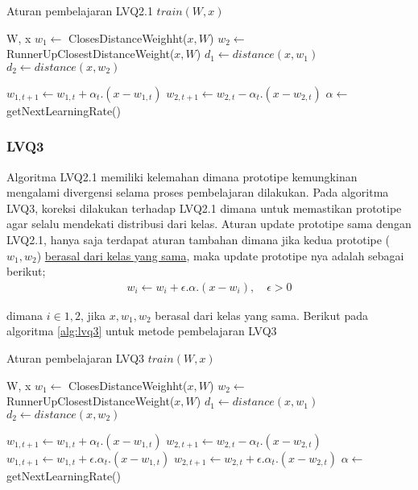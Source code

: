 \begin{algorithm}  
\scriptsize 
\caption{Aturan pembelajaran LVQ2.1 $train(W, x)$}          
\label{alg:lvq21}                           
\begin{algorithmic}                    %
	\REQUIRE W, x
	\STATE $w_1 \leftarrow $ ClosesDistanceWeighht($x, W$)
	\STATE $w_2 \leftarrow $ RunnerUpClosestDistanceWeight($x, W$)
	\STATE $d_1 \leftarrow distance(x, w_1)$
	\STATE $d_2 \leftarrow distance(x, w_2)$
	
			\STATE $w_{1,t+1} \leftarrow w_{1,t} + \alpha_t . (x - w_{1,t})$
			\STATE $w_{2,t+1} \leftarrow w_{2,t} - \alpha_t . (x - w_{2,t})$
		\ENDIF
	\ENDIF
	\STATE $\alpha \leftarrow $ getNextLearningRate()
\end{algorithmic}
\end{algorithm}

\subsubsection*{LVQ3}
Algoritma LVQ2.1 memiliki kelemahan dimana prototipe kemungkinan mengalami
divergensi selama proses pembelajaran dilakukan\cite{Sato:1998}. Pada algoritma
LVQ3, koreksi dilakukan terhadap LVQ2.1 dimana untuk memastikan prototipe agar
selalu mendekati distribusi dari kelas. Aturan update prototipe sama dengan
LVQ2.1, hanya saja terdapat aturan tambahan dimana jika kedua prototipe ($w_1,
w_2$) \underline{berasal dari kelas yang sama}, maka update prototipe nya adalah
sebagai berikut;
\begin{align}
w_i \leftarrow w_i + \epsilon . \alpha . (x - w_i), \quad \epsilon > 0
\end{align}

\noindent
dimana $i \in {1,2}$, jika $x, w_1, w_2$ berasal dari kelas yang sama.
Berikut pada algoritma \ref{alg:lvq3} untuk metode pembelajaran LVQ3

\begin{algorithm}  
\scriptsize 
\caption{Aturan pembelajaran LVQ3 $train(W, x)$}          
\label{alg:lvq3}                           
\begin{algorithmic}                    %
	\REQUIRE W, x
	\STATE $w_1 \leftarrow $ ClosesDistanceWeighht($x, W$)
	\STATE $w_2 \leftarrow $ RunnerUpClosestDistanceWeight($x, W$)
	\STATE $d_1 \leftarrow distance(x, w_1)$
	\STATE $d_2 \leftarrow distance(x, w_2)$
	
			\STATE $w_{1,t+1} \leftarrow w_{1,t} + \alpha_t . (x - w_{1,t})$
			\STATE $w_{2,t+1} \leftarrow w_{2,t} - \alpha_t . (x - w_{2,t})$
		\ENDIF
	\ELSE
		\STATE $w_{1,t+1} \leftarrow w_{1,t} + \epsilon.\alpha_t . (x - w_{1,t})$
		\STATE $w_{2,t+1} \leftarrow w_{2,t} + \epsilon.\alpha_t . (x - w_{2,t})$
	\ENDIF
	\STATE $\alpha \leftarrow $ getNextLearningRate()
\end{algorithmic}
\end{algorithm}  

